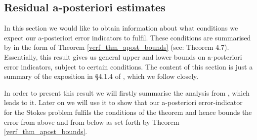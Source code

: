 \documentclass[12pt,a4paper]{article}
\theoremstyle{definition}
\begin{document}
\subsection{Residual a-posteriori estimates}
In this section we would like to obtain information about what conditions we expect our a-posteriori error indicators to fulfil.  These conditions are summarised by \cite{verfurth2013posteriori} in the form of Theorem \ref{verf_thm_apost_bounds} (see\cite{verfurth2013posteriori}: Theorem 4.7).  Essentially, this result gives us general upper and lower bounds on a-posteriori error indicators, subject to certain conditions.  The content of this section is just a summary of the exposition in \S4.1.4 of \cite{verfurth2013posteriori}, which we follow closely.  

In order to present this result we  will firstly summarise the analysis from \cite{verfurth2013posteriori}, which leads to it.  Later on we will use it to show that our a-posteriori error-indicator for the Stokes problem fulfils the conditions of the theorem and hence bounds the error from above and from below as set forth by Theorem \ref{verf_thm_apost_bounds}.  
\end{document}
